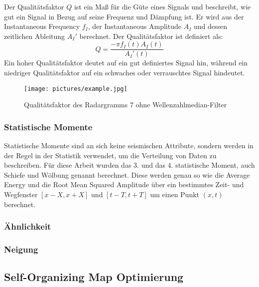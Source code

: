 Der Qualitätsfaktor $Q$ \parencite{noauthor_instantaneous_2024} ist ein Maß für die Güte eines Signals und beschreibt, wie gut ein Signal in Bezug auf seine Frequenz und Dämpfung ist. Er wird aus der Instantaneous Frequency $f_I$, der Instantaneous Amplitude $A_I$ und dessen zeitlichen Ableitung $A_I'$ berechnet. Der Qualitätsfaktor ist definiert als: \\

\begin{equation}
    Q = \frac{-\pi f_I(t) A_I(t)}{A_I'(t)}
\end{equation}
Ein hoher Qualitätsfaktor deutet auf ein gut definiertes Signal hin, während ein niedriger Qualitätsfaktor auf ein schwaches oder verrauschtes Signal hindeutet.

\begin{figure}[H]
    \centering
    \texttt{[image: pictures/example.jpg]}
    \caption{Qualitätsfaktor des Radargramms 7 ohne Wellenzahlmedian-Filter}
    \label{fig:quality_factor}
\end{figure}

\subsubsection{Statistische Momente}

Statistische Momente sind an sich keine seismischen Attribute, sondern werden in der Regel in der Statistik verwendet, um die Verteilung von Daten zu beschreiben. Für diese Arbeit wurden das 3. und das 4. statistische Moment, auch Schiefe und Wölbung genannt berechnet. Diese werden genau so wie die Average Energy und die Root Mean Squared Amplitude über ein bestimmtes Zeit- und Wegfenster $\left[x-X, x+X\right]$ und $\left[t-T, t+T\right]$ um einen Punkt $(x,t)$ berechnet. 

\subsubsection{Ähnlichkeit}
\subsubsection{Neigung}

\subsection{Self-Organizing Map Optimierung}
\lipsum[1-5]